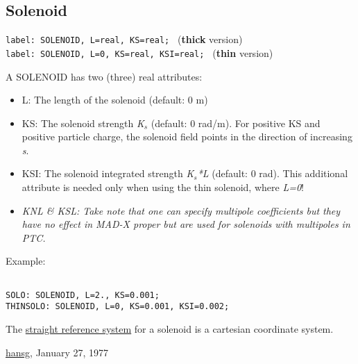 





\subsection{Solenoid}

\texttt{label: SOLENOID, L=real, KS=real;           } (\textbf{thick} version) 
\\\texttt{label: SOLENOID, L=0,    KS=real, KSI=real; } (\textbf{thin} version) 

  A SOLENOID has two (three) real attributes: 
\begin{itemize}
	\item L: The length of the solenoid (default: 0 m) 
	\item KS: The solenoid strength \textit{K$_s$} (default: 0 rad/m). For positive KS and positive particle charge, the solenoid field points in the direction of increasing \textit{s}. 
	\item KSI: The solenoid integrated strength \textit{K$_s$*L} (default: 0 rad).  This additional attribute is needed only when using the thin solenoid,  where \textit{L=0}!    
	\item \textit{ KNL \& KSL:  Take note that one can specify multipole coefficients but they have no effect in MAD-X proper but are used for solenoids with multipoles in PTC.}
\end{itemize}

 Example: 
\begin{verbatim}

SOLO: SOLENOID, L=2., KS=0.001;
THINSOLO: SOLENOID, L=0, KS=0.001, KSI=0.002;
\end{verbatim}

 The \href{local_system.html#straight}{straight reference system} for a solenoid is a cartesian coordinate system. 

\href{http://www.cern.ch/Hans.Grote/hansg_sign.html}{hansg}, January 27, 1977 

